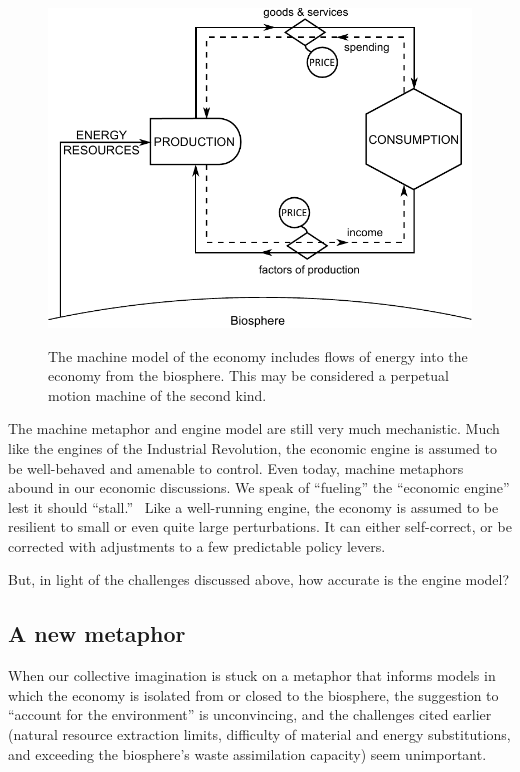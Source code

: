 \begin{figure}[!ht]
\centering\
\includegraphics[width=\linewidth]{Part_0/Chapter_Introduction/images/Perpetual_motion_2.pdf}
\caption[The machine model]{The machine model of the economy includes
flows of energy into the economy from the biosphere.
This may be considered a perpetual motion machine 
of the second kind.}
\label{fig:perp_motion_2}
\end{figure}

The machine metaphor and engine model are still very much mechanistic.
Much like the engines of the Industrial Revolution,
the economic engine is assumed to be well-behaved and amenable to control.
Even today, machine metaphors abound in our economic discussions.
We speak of ``fueling'' the ``economic engine'' 
lest it should ``stall.''~\cite{Liu2012}
Like a well-running engine, the economy is assumed 
to be resilient to small or even quite large perturbations.  
It can either self-correct, 
or be corrected with adjustments to
a few predictable policy levers.

But, in light of the challenges discussed above,
how accurate is the engine model?


\subsection{A new metaphor}
\label{sec:new_metaphor}

When our collective imagination is stuck on a metaphor that 
informs models in which the economy is isolated from or closed to the biosphere,
the suggestion to ``account for the environment'' is unconvincing, and 
the challenges cited earlier (natural resource extraction limits,
difficulty of material and energy substitutions, and 
exceeding the biosphere's waste assimilation capacity)
seem unimportant. 

